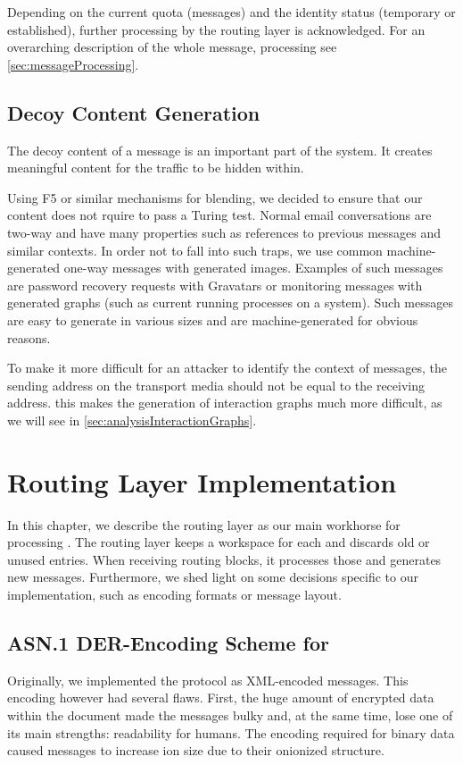 Depending on the current quota (messages) and the identity status (temporary or established), further processing by the routing layer is acknowledged. For an overarching description of the whole message, processing see \cref{sec:messageProcessing}.


\section{Decoy Content Generation}
The decoy content of a message is an important part of the \MessageVortex{} system. It creates meaningful content for the traffic to be hidden within.

Using F5 or similar mechanisms for blending, we decided to ensure that our content does not rquire to pass a Turing test. Normal email conversations are two-way and have many properties such as references to previous messages and similar contexts. In order not to fall into such traps, we use common machine-generated one-way messages with generated images. Examples of such messages are password recovery requests with Gravatars or monitoring messages with generated graphs (such as current running processes on a system). Such messages are easy to generate in various sizes and are machine-generated for obvious reasons.

To make it more difficult for an attacker to identify the context of messages, the sending address on the transport media should not be equal to the receiving address. this makes the generation of interaction graphs much more difficult, as we will see in \cref{sec:analysisInteractionGraphs}.

\chapter{Routing Layer Implementation}\label{sec:routingImplementation}
In this chapter, we describe the routing layer as our main workhorse for processing \VortexMessages. The routing layer keeps a workspace for each  and discards old or unused entries. When receiving routing blocks, it processes those and generates new messages. Furthermore, we shed light on some decisions specific to our implementation, such as encoding formats or message layout.

\section{ASN.1 DER-Encoding Scheme for \VortexMessages}
Originally, we implemented the protocol as XML-encoded messages. This encoding however had several flaws. First, the huge amount of encrypted data within the document made the messages bulky and, at the same time, lose one of its main strengths: readability for humans. The encoding required for binary data caused messages to increase ion size due to their onionized structure. 

